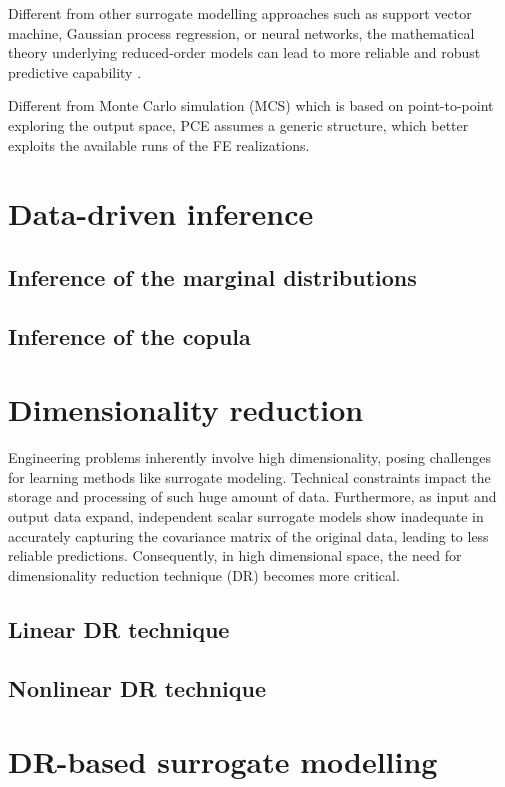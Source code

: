 Different from other surrogate modelling approaches such as support vector machine, Gaussian process regression, or neural networks, the mathematical theory underlying reduced-order models can lead to more reliable and robust predictive capability \citep{frangos2010,kapteyn2021}.

Different from Monte Carlo simulation (MCS) which is based on point-to-point exploring the output space, PCE assumes a generic structure, which better exploits the available runs of the FE realizations.

\section{Data-driven inference}
\subsection{Inference of the marginal distributions}
\subsection{Inference of the copula}
\section{Dimensionality reduction}


Engineering problems inherently involve high dimensionality, posing challenges for learning methods like surrogate modeling. Technical constraints impact the storage and processing of such huge amount of data. Furthermore, as input and output data expand, independent scalar surrogate models show inadequate in accurately capturing the covariance matrix of the original data, leading to less reliable predictions. Consequently, in high dimensional space, the need for dimensionality reduction technique (DR) becomes more critical. 


\subsection{Linear DR technique}

\subsection{Nonlinear DR technique}

\section{DR-based surrogate modelling}

